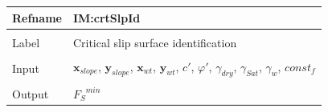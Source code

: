 \documentclass[12pt]{article}
\begin{document}
\vspace{\baselineskip}
\noindent
\begin{minipage}{\textwidth}
\begin{tabular}{>{\raggedright}p{}>{\raggedright\arraybackslash}p{}}
\toprule \textbf{Refname} & \textbf{IM:crtSlpId}
\label{IM:crtSlpId}
\\ \midrule \\
Label & Critical slip surface identification
        
\\ \midrule \\
Input & ${\mathbf{x}_{slope}}$, ${\mathbf{y}_{slope}}$, ${\mathbf{x}_{wt}}$, ${\mathbf{y}_{wt}}$, $c'$, $φ'$, ${γ_{dry}}$, ${γ_{Sat}}$, ${γ_{w}}$, $const_f$
        
\\ \midrule \\
Output & ${{F_{S}}^{min}}$
         

\end{tabular}
\end{minipage}
\end{document}
